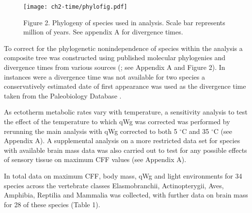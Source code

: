 \begin{figure}[h!]
  \centering
  \texttt{[image: ch2-time/phylofig.pdf]}
  \caption[ ]{Figure 2. Phylogeny of species used in analysis. Scale bar represents million of years. See appendix A for divergence times.}
  \label{fig:Figure 2.}
\end{figure}


To correct for the phylogenetic nonindependence of species within the analysis a composite tree was constructed using published molecular phylogenies and divergence times from various sources (\cite{schoch1985preliminary,janossy2011pleistocene,mercer2003effects,hedges2006timetree,wiens2006does,benton2007paleontological,murphy2007using,brown2008strong,li2008optimal,naro2008evolutionary,albert2009effect,lim2010phylogeny,little2010evolutionary,perelman2011molecular}; see Appendix A and Figure 2). In instances were a divergence time was not available for two species a conservatively estimated date of first appearance was used as the divergence time taken from the Paleobiology Database \citep{alroy2008phanerozoic}.


As ectotherm metabolic rates vary with temperature, a sensitivity analysis to test the effect of the temperature to which qWg was corrected was performed by rerunning the main analysis with qWg corrected to both 5 $^{\circ}$C and 35 $^{\circ}$C (see Appendix A). A supplemental analysis on a more restricted data set for species with available brain mass data was also carried out to test for any possible effects of sensory tissue on maximum CFF values (see Appendix A).

In total data on maximum CFF, body mass, qWg and light environments for 34 species across the vertebrate classes Elasmobranchii, Actinopterygii, Aves, Amphibia, Reptilia and Mammalia was collected, with further data on brain mass for 28 of these species (Table 1).


